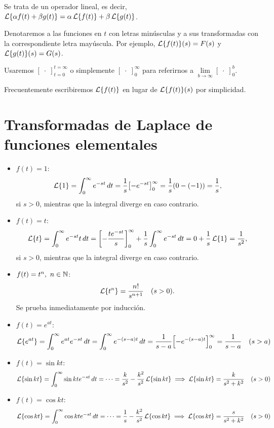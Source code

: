 \documentclass[../ecuaciones_diferenciales.tex]{subfiles}
\begin{document}
\begin{remark}
	Se trata de un operador lineal, es decir, \(\operatorname{\mathcal{L}}\{\alpha f(t) + \beta g(t)\} =
	\alpha \operatorname{\mathcal{L}}\{f(t)\} + \beta \operatorname{\mathcal{L}}\{g(t)\}\).
\end{remark}

\begin{notation}
	Denotaremos a las funciones en \(t\) con letras minúsculas y
	a sus transformadas con la correspondiente letra mayúscula. Por
	ejemplo, \(\operatorname{\mathcal{L}}\{f(t)\}(s) = F(s)\) y \(\operatorname{\mathcal{L}}\{g(t)\}(s) = G(s)\).
\end{notation}

\begin{notation}
	Usaremos \([\;\cdot\;]_{t=0}^{t=\infty}\) o simplemente
	\([\;\cdot\;]_0^\infty\) para referirnos a
	\(\lim \limits_{b \to \infty} [\;\cdot\;]_0^b\).
\end{notation}

\begin{notation}
	Frecuentemente escribiremos \(\operatorname{\mathcal{L}}\{f(t)\}\) en lugar de
	\(\operatorname{\mathcal{L}}\{f(t)\}(s)\) por simplicidad.
\end{notation}

\section{Transformadas de Laplace de funciones elementales}

\begin{itemize}
	\item \(f(t) = 1\):
	      \[\laplace\{1\} = \int_0^\infty e^{-st} \dif t = \frac{1}{s}
		      \left[-e^{-st}\right]_0^\infty = \frac{1}{s}(0-(-1)) =
		      \frac{1}{s},\]
	      si \(s > 0\), mientras que la integral diverge en caso contrario.
	\item \(f(t) = t\):
	      \[\laplace\{t\} = \int_0^\infty e^{-st}t \dif t =
		      \left[-\frac{te^{-st}}{s}\right]_0^\infty + \frac{1}{s} \int_0^\infty
		      e^{-st} \dif t = 0 + \frac{1}{s} \laplace\{1\} = \frac{1}{s^2},\]
	      si \(s > 0\), mientras que la integral diverge en caso contrario.
	\item \(f(t) = t^n,\ n \in \mathbb{N}\):
	      \[\operatorname{\mathcal{L}}\{t^n\} = \frac{n!}{s^{n+1}} \quad (s>0).\]
	      Se prueba inmediatamente por inducción.
	\item \(f(t) = e^{at}\):
	      \[\laplace\{e^{at}\} = \int_0^\infty e^{at}e^{-st} \dif t = \int_0^\infty
		      e^{-(s-a)t} \dif t = \frac{1}{s-a}\left[-e^{-(s-a)t}\right]_0^\infty =
		      \frac{1}{s-a} \quad (s>a)\]
	\item \(f(t) = \sin kt\):
	      \[\operatorname{\mathcal{L}}\{\sin kt\} = \int_0^\infty \sin kt e^{-st} \mathop{d\!} t = \cdots = \frac{k}{s^2} -
		      \frac{k^2}{s^2} \operatorname{\mathcal{L}}\{\sin kt\} \implies \operatorname{\mathcal{L}}\{\sin kt\} = \frac{k}{s^2+k^2}
		      \quad (s>0)\]
	\item \(f(t) = \cos kt\):
	      \[\operatorname{\mathcal{L}}\{\cos kt\} = \int_0^\infty \cos kt e^{-st} \mathop{d\!} t = \cdots = \frac{1}{s} -
		      \frac{k^2}{s^2}\operatorname{\mathcal{L}}\{\cos kt\} \implies  \operatorname{\mathcal{L}}\{\cos kt\} = \frac{s}{s^2+k^2}
		      \quad (s>0)\]
\end{itemize}
\end{document}

